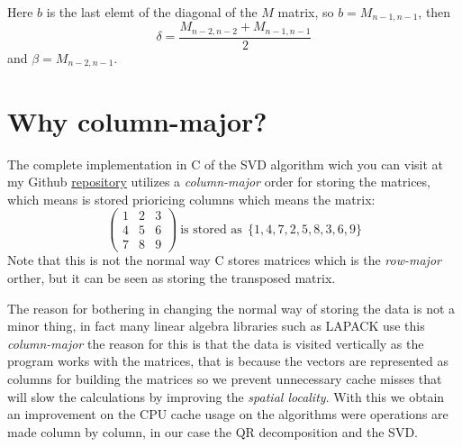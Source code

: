 \documentclass{scrartcl}
\begin{document}
Here $b$ is the last elemt of the diagonal of the $M$ matrix, so $b = M_{n-1,n-1}$, then
\[
\delta = \frac{M_{n-2,n-2} + M_{n-1,n-1}}{2}
\]
and $\beta = M_{n-2,n-1}$.

\section{Why column-major?}

The complete implementation in C of the SVD algorithm wich you can visit at my Github \href{https://github.com/juanyagoc/algebra-svd}{repository} utilizes a \emph{column-major} order for storing the matrices, which means is stored prioricing columns which means the matrix:
\[
 \begin{pmatrix}
    1 & 2 & 3 \\
    4 & 5 & 6 \\
    7 & 8 & 9
 \end{pmatrix} \ \text{is stored as} \ \ \{1,4,7,2,5,8,3,6,9\}
\]
Note that this is not the normal way C stores matrices which is the \emph{row-major} orther, but it can be seen as storing the transposed matrix.

The reason for bothering in changing the normal way of storing the data is not a minor thing, in fact many linear algebra libraries such as LAPACK use this \emph{column-major} the reason for this is that the data is visited vertically as the program works with the matrices, that is because the vectors are represented as columns for building the matrices so we prevent unnecessary cache misses that will slow the calculations by improving the \emph{spatial locality}. With this we obtain an improvement on the CPU cache usage on the algorithms were operations are made column by column, in our case the QR decomposition and the SVD.
\end{document}
